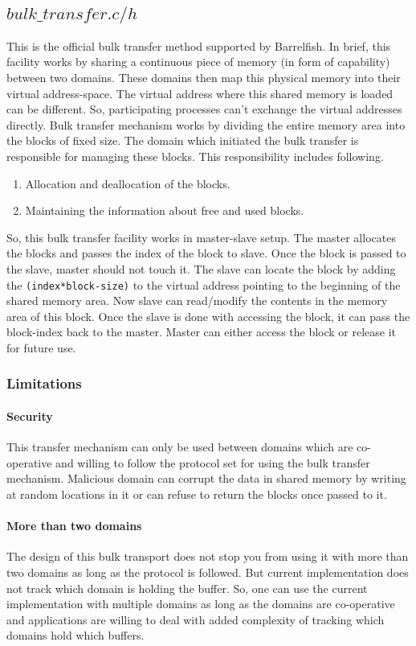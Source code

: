 \documentclass[a4paper,twoside]{report} %
\begin{document}
\subsection{$bulk\_transfer.c/h$}
This is the official bulk transfer method supported by Barrelfish.  In brief, this 
facility works by sharing a continuous piece of memory (in form of capability) 
between two domains.  These domains then map this physical memory into their 
virtual address-space.  The virtual address where this shared memory is loaded
can be different.  So, participating processes can't exchange the virtual 
addresses directly.  Bulk transfer mechanism works by dividing the entire 
memory area into the blocks of fixed size.  The domain which initiated the 
bulk transfer is responsible for managing these blocks.  This responsibility
includes following.
\begin{enumerate}
  \item Allocation and deallocation of the blocks.
  \item Maintaining the information about free and used blocks.
\end{enumerate}
So, this bulk transfer facility works in master-slave setup.  The master
allocates the blocks and passes the index of the block to slave.  
Once the block is passed to the slave, master should not touch it.  
The slave can locate the block by adding the \texttt{(index*block-size)} to the
virtual address pointing to the beginning of the shared memory area.
Now slave can read/modify the contents in the memory area of this block.  Once
the slave is done with accessing the block, it can pass the block-index
back to the master.  Master can either access the block or release it
for future use.

\subsubsection{Limitations}
\paragraph{Security}
This transfer mechanism can only be used between domains which are
co-operative and willing to follow the protocol set for using the bulk
transfer mechanism.  Malicious domain can corrupt the data in shared
memory by writing at random locations in it
or can refuse to return the blocks once passed to it.

\paragraph{More than two domains}
The design of this bulk transport does not stop you from using it with
more than two domains as long as the protocol is followed.  But current
implementation does not track which domain is holding the buffer. So,
one can use the current implementation with multiple domains as long
as the domains are co-operative and applications are willing to deal
with added complexity of tracking which domains hold which buffers.
\end{document}
